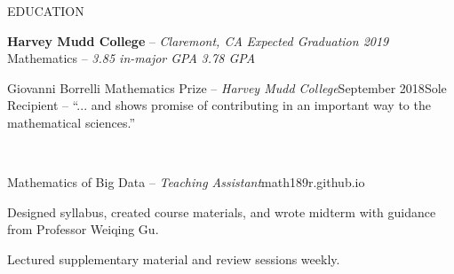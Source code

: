 \documentclass{resume} %
\begin{document}
\begin{rSection}{EDUCATION}

{{\bf Harvey Mudd College} -- {\it Claremont, CA}} \hfill {\em Expected Graduation 2019} \\ 
Mathematics -- {\em 3.85 in-major GPA} \hfill {\em 3.78 GPA}\\[-1.25em]

\begin{rSubsection}{Giovanni Borrelli Mathematics Prize -- {\it Harvey Mudd College}}{September 2018}{Sole Recipient -- ``... and shows promise of contributing in an important way to the mathematical sciences.''}
\item\quad\\[-3.25em]
\end{rSubsection}

\begin{rSubsection}{Mathematics of Big Data -- {\it Teaching Assistant}}{\textsf{math189r.github.io}}{}

\item Designed syllabus, created course materials, and wrote midterm with guidance from Professor Weiqing Gu.
\item Lectured supplementary material and review sessions weekly.
\end{rSubsection}
\end{rSection}
\end{document}
